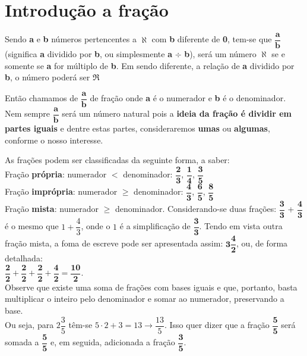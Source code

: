 	
 \section{Introdução a fração}
 	Sendo \textbf{a} e \textbf{b} números pertencentes a \textbf{$\aleph$} com \textbf{b} diferente de \textbf{0}, tem-se que $\dfrac{\textbf{a}}{\textbf{b}}$  (significa \textbf{a} dividido por \textbf{b}, ou simplesmente \textbf{a} $\div$ \textbf{b}), será um número \textbf{$\aleph$} se e somente se \textbf{a} for múltiplo de \textbf{b}. Em sendo diferente, a relação de \textbf{a} dividido por \textbf{b}, o número poderá ser \textbf{$\Re$}
 	
 	Então chamamos de $\dfrac{\textbf{a}}{\textbf{b}}$ de fração onde \textbf{a} é o numerador e \textbf{b} é o denominador. Nem sempre $\dfrac{\textbf{a}}{\textbf{b}}$ será um número natural pois a \textbf{ideia da fração é dividir em partes iguais} e dentre estas partes, consideraremos \textbf{umas} ou \textbf{algumas}, conforme o nosso interesse.
 	
 	As frações podem ser classificadas da seguinte forma, a saber:\\
 	
 	\indent \indent Fração \textbf{própria}: numerador $<$ denominador: $\dfrac{\textbf{2}}{\textbf{3}}$, $\dfrac{\textbf{1}}{\textbf{4}}$, $\dfrac{\textbf{3}}{\textbf{5}}$ \\
 	
 	\indent \indent Fração \textbf{imprópria}: numerador $\ge$ denominador: $\dfrac{\textbf{4}}{\textbf{3}}$, $\dfrac{\textbf{6}}{\textbf{5}}$, $\dfrac{\textbf{8}}{\textbf{5}}$ \\
 	
 	\indent \indent Fração \textbf{mista}: numerador $\geq$ denominador. Considerando-se duas frações: $\dfrac{\textbf{3}}{\textbf{3}}$ + $\dfrac{\textbf{4}}{\textbf{3}}$ é o mesmo que $ 1 + \dfrac{4}{3} $, onde o $ 1 $ é a simplificação de $\dfrac{\textbf{3}}{\textbf{3}}$. Tendo em vista outra fração mista, a foma de escreve pode ser apresentada assim: $\textbf{3}\dfrac{\textbf{4}}{\textbf{2}}$, ou, de forma detalhada:\\
 	
 	$\dfrac{\textbf{2}}{\textbf{2}} + \dfrac{\textbf{2}}{\textbf{2}} + \dfrac{\textbf{2}}{\textbf{2}} + \dfrac{\textbf{4}}{\textbf{2}} = \dfrac{\textbf{10}}{\textbf{2}}$. \\
 	
 	Observe que existe uma soma de frações com bases iguais e que, portanto, basta multiplicar o inteiro pelo denominador e somar ao numerador, preservando a base. \\
 	Ou seja, para $ 2\dfrac{3}{5} $ têm-se $ 5 \cdot 2 + 3 = 13 \longrightarrow \dfrac{13}{5} $. 
	Isso quer dizer que a fração $\dfrac{\textbf{5}}{\textbf{5}}$ será somada a $\dfrac{\textbf{5}}{\textbf{5}}$ e, em seguida, adicionada a fração $\dfrac{\textbf{3}}{\textbf{5}}$.
 	
